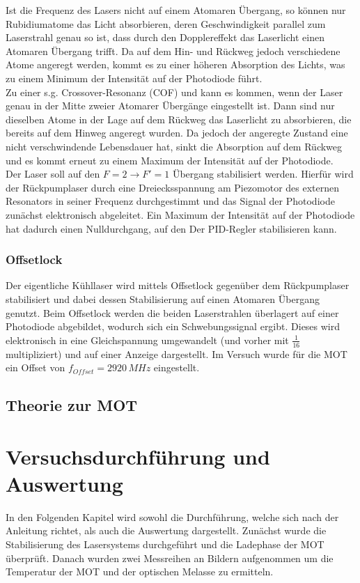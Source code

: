 \documentclass[twoside,colorback,accentcolor=tud4c,11pt]{tudreport}
\begin{document}
Ist die Frequenz des Lasers nicht auf einem Atomaren Übergang, so können nur Rubidiumatome das Licht absorbieren, deren Geschwindigkeit parallel zum Laserstrahl genau so ist, dass durch den Dopplereffekt das Laserlicht einen Atomaren Übergang trifft. Da auf dem Hin- und Rückweg jedoch verschiedene Atome angeregt werden, kommt es zu einer höheren Absorption des Lichts, was zu einem Minimum der Intensität auf der Photodiode führt.\\
Zu einer s.g. Crossover-Resonanz (COF) und kann es kommen, wenn der Laser genau in der Mitte zweier Atomarer Übergänge eingestellt ist. Dann sind nur dieselben Atome in der Lage auf dem Rückweg das Laserlicht zu absorbieren, die bereits auf dem Hinweg angeregt wurden. Da jedoch der angeregte Zustand eine nicht verschwindende Lebensdauer hat, sinkt die Absorption auf dem Rückweg und es kommt erneut zu einem Maximum der Intensität auf der Photodiode.\\
Der Laser soll auf den $F=2\rightarrow F'=1$ Übergang stabilisiert werden. Hierfür wird der Rückpumplaser durch eine Dreiecksspannung am Piezomotor des externen Resonators in seiner Frequenz durchgestimmt und das Signal der Photodiode zunächst elektronisch abgeleitet. Ein Maximum der Intensität auf der Photodiode hat dadurch einen Nulldurchgang, auf den Der PID-Regler stabilisieren kann. 
\subsection{Offsetlock}
Der eigentliche Kühllaser wird mittels Offsetlock gegenüber dem Rückpumplaser stabilisiert und dabei dessen Stabilisierung auf einen Atomaren Übergang genutzt. Beim Offsetlock werden die beiden Laserstrahlen überlagert auf einer Photodiode abgebildet, wodurch sich ein Schwebungssignal ergibt. Dieses wird elektronisch in eine Gleichspannung umgewandelt (und vorher mit $\frac{1}{16}$ multipliziert) und auf einer Anzeige dargestellt. Im Versuch wurde für die MOT ein Offset von $f_{Offset}=2920\,\si{MHz}$ eingestellt.
\section{Theorie zur MOT}\label{theorie} 	
\chapter{Versuchsdurchführung und Auswertung}
In den Folgenden Kapitel wird sowohl die Durchführung, welche sich nach der Anleitung \cite{anl} richtet, als auch die Auswertung dargestellt. Zunächst wurde die Stabilisierung des Lasersystems durchgeführt und die Ladephase der MOT überprüft. Danach wurden zwei Messreihen an Bildern aufgenommen um die Temperatur der MOT und der optischen Melasse zu ermitteln.
\end{document}
